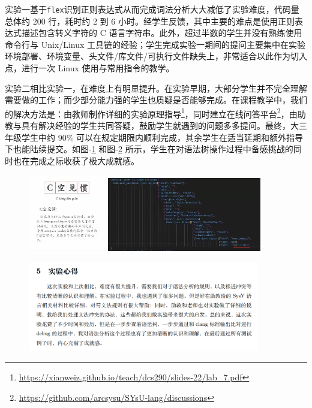 \documentclass{SCIS2020cn}
\begin{document}

实验一基于\texttt{flex}识别正则表达式从而完成词法分析大大减低了实验难度，代码量总体约 200 行，耗时约 2 到 6 小时。经学生反馈，其中主要的难点是使用正则表达式描述包含转义字符的 C 语言字符串。此外，超过半数的学生并没有熟练使用命令行与 Unix/Linux 工具链的经验；学生完成实验一期间的提问主要集中在实验环境部署、环境变量、头文件/库文件/可执行文件缺失上，非常适合以此作为切入点，进行一次 Linux 使用与常用指令的教学。

实验二相比实验一，在难度上有明显提升。在实验早期，大部分学生并不完全理解需要做的工作；而少部分能力强的学生也质疑是否能够完成。在课程教学中，我们的解决方法是：由教师制作详细的实验原理指导\footnote{\url{https://xianweiz.github.io/teach/dcs290/slides-22/lab_7.pdf}}，同时建立在线问答平台\footnote{\url{https://github.com/arcsysu/SYsU-lang/discussions}}，由助教与具有解决经验的学生共同答疑，鼓励学生就遇到的问题多多提问。最终，大三年级学生中约 90\% 可以在规定期限内顺利完成，其余学生在适当延期和额外指导下也能陆续提交。如图-\ref{tucao} 和图-\ref{report2} 所示，学生在对语法树操作过程中备感挑战的同时也在完成之际收获了极大成就感。

\begin{figure}
    \centering
    \includegraphics[width=0.3\textwidth]{assets/image/tucao.jpg}
    \includegraphics[width=0.6\textwidth]{assets/image/tucao1.jpg}
    \label{tucao}
\end{figure}

\begin{figure}
    \centering
    \includegraphics[width=0.9\textwidth]{assets/image/report2}
    \label{report2}
\end{figure}
\end{document}
